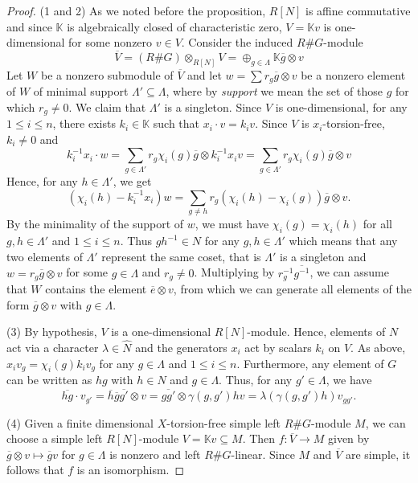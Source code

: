 \documentclass[11pt, twoside]{amsart}
\theoremstyle{definition}
\newcommand{\KK}{\mathbb{K}}
\begin{document}
\begin{proof}
    (1 and 2) As we noted before the proposition, $R[N]$ is affine commutative and since $\KK$ is algebraically closed of characteristic zero, $V = \KK v$ is one-dimensional for some nonzero $v \in V$. Consider the induced $R\# G$-module 
    \[\overline{V} = (R\# G) \otimes_{R[N]}V = \oplus_{g \in \Lambda}\KK\overline{g} \otimes v\]
    Let $W$ be a nonzero submodule of $\overline{V}$ and let $w = \sum r_g \overline{g}\otimes v$ be a nonzero element of $W$ of minimal support $\Lambda' \subseteq \Lambda$, where by \emph{support} we mean the set of those $g$ for which $r_g \neq 0$. We claim that $\Lambda'$ is a singleton. Since $V$ is one-dimensional, for any $1 \leq i \leq n$, there exists $k_i \in \KK$ such that $x_i \cdot v = k_i v$. Since $V$ is $x_i$-torsion-free, $k_i \neq 0$ and 
    \[k_{i}^{-1}x_i \cdot w = \sum_{g \in \Lambda'}r_g \chi_{i}(g)\overline{g}\otimes k_{i}^{-1}x_i v = \sum_{g\in \Lambda'}r_g \chi_{i}(g)\overline{g} \otimes v\]
    Hence, for any $h \in \Lambda'$, we get
    \[(\chi_{i}(h) - k_{i}^{-1}x_{i})w = \sum_{g\neq h}r_g (\chi_{i}(h) - \chi_{i}(g))\overline{g} \otimes v.\]
    By the minimality of the support of $w$, we must have $\chi_{i}(g) = \chi_{i}(h)$ for all $g, h \in \Lambda'$ and $1 \leq i \leq n$. Thus $gh^{-1}\in N$ for any $g, h \in \Lambda'$ which means that any two elements of $\Lambda'$ represent the same coset, that is $\Lambda'$ is a singleton and $w = r_g \overline{g} \otimes v$ for some $g \in \Lambda$ and $r_g \neq 0$. Multiplying by $r_{g}^{-1}\overline{g^{-1}}$, we can assume that $W$ contains the element $\overline{e} \otimes v$, from which we can generate all elements of the form $\overline{g} \otimes v$ with $g \in \Lambda$.

    (3) By hypothesis, $V$ is a one-dimensional $R[N]$-module. Hence, elements of $N$ act via a character $\lambda \in \widehat{N}$ and the generators $x_i$ act by scalars $k_i$ on $V$. As above, $x_i v_g = \chi_{i}(g)k_i v_g$ for any $g \in \Lambda$ and $1 \leq i \leq n$. Furthermore, any element of $G$ can be written as $hg$ with $h \in N$ and $g \in \Lambda$. Thus, for any $g' \in \Lambda$, we have
    \[\overline{hg}\cdot v_{g'} = \overline{h}\overline{g}\overline{g'}\otimes v = \overline{gg'} \otimes \gamma(g, g')hv = \lambda(\gamma(g,g')h)v_{gg'}.\]

    (4) Given a finite dimensional $X$-torsion-free simple left $R\# G$-module $M$, we can choose a simple left $R[N]$-module $V = \KK v \subseteq M$. Then $f: \overline{V} \to M$ given by $\overline{g}\otimes v \mapsto \overline{g}v$ for $g \in \Lambda$ is nonzero and left $R\# G$-linear. Since $M$ and $\overline{V}$ are simple, it follows that $f$ is an isomorphism. 
\end{proof}
\end{document}
